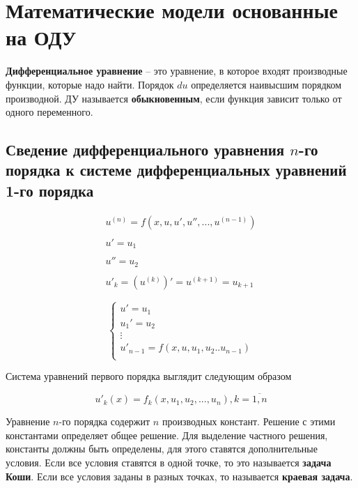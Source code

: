 \chapter{Математические модели основанные на ОДУ}

\textbf{Дифференциальное уравнение} -- это уравнение, в которое входят
производные функции, которые надо найти. Порядок $du$ определяется
наивысшим порядком производной. ДУ называется \textbf{обыкновенным},
если функция зависит только от одного переменного.

\section{Сведение дифференциального уравнения $n$-го порядка к системе
дифференциальных уравнений 1-го порядка}

\begin{equation*}
    \begin{matrix}
        u^{(n)} = f (x, u, u', u'', ..., u^{(n-1)}) \\
        \\
        u' = u_1 \\
        \\
        u'' = u_2 \\
        \\
        u'_k = (u^{(k)})' = u^{(k+1)} = u_{k+1}
    \end{matrix}
\end{equation*}

\begin{equation*}
    \begin{cases}
        u'=u_1 \\
        u_1'=u_2 \\
        \vdots \\
        u'_{n-1} = f(x, u, u_1, u_2 .. u_{n-1}) \\
    \end{cases}
\end{equation*}

Система уравнений первого порядка выглядит следующим образом

\begin{equation*}
    u'_k(x) = f_k(x, u_1, u_2, ..., u_n),
    k = \overline{1,n}
\end{equation*}

Уравнение $n$-го порядка содержит $n$ производных
констант. Решение с этими константами определяет общее решение.
Для выделение частного решения, константы должны быть определены,
для этого ставятся дополнительные условия. Если все условия ставятся
в одной точке, то это называется \textbf{задача Коши}. Если все условия
заданы в разных точках, то называется \textbf{краевая задача}.

